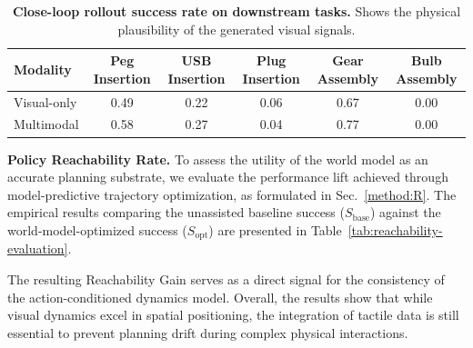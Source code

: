 \documentclass{article}
\begin{document}
\vspace{-1em}
\begin{table}[h]
    \centering
    \caption{\small \textbf{Close-loop rollout success rate on downstream tasks.} Shows the physical plausibility of the generated visual signals.}
    \vspace{0.5em}
    \small
    \begin{tabular}{lccccc}
        \hline
        \textbf{Modality} & \textbf{Peg Insertion} & \textbf{USB Insertion} & \textbf{Plug Insertion} & \textbf{Gear Assembly} & \textbf{Bulb Assembly} \\
        \hline
        Visual-only       & 0.49 & 0.22 & 0.06 & 0.67 & 0.00  \\
        Multimodal   & 0.58 & 0.27 & 0.04 & 0.77 & 0.00  \\
        \hline
    \end{tabular}
    \label{tab:close-loop-success-rate}
\end{table}

\textbf{Policy Reachability Rate.} To assess the utility of the world model as an accurate planning substrate, we evaluate the performance lift achieved through model-predictive trajectory optimization, as formulated in Sec.~\ref{method:R}. The empirical results comparing the unassisted baseline success ($S_{\text{base}}$) against the world-model-optimized success ($S_{\text{opt}}$) are presented in Table~\ref{tab:reachability-evaluation}.

The resulting Reachability Gain serves as a direct signal for the consistency of the action-conditioned dynamics model. Overall, the results show that while visual dynamics excel in spatial positioning, the integration of tactile data is still essential to prevent planning drift during complex physical interactions.
\end{document}
